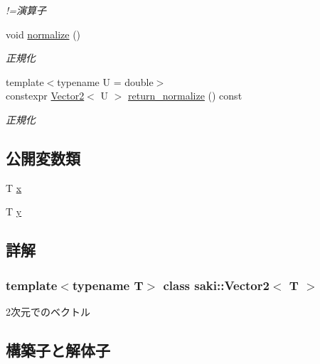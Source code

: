 \begin{DoxyCompactItemize}
\begin{DoxyCompactList}\small\item\em !=演算子 \end{DoxyCompactList}\item 
void \mbox{\hyperlink{classsaki_1_1_vector2_a8267f8608ffad9796813856c05076d8c}{normalize}} ()
\begin{DoxyCompactList}\small\item\em 正規化 \end{DoxyCompactList}\item 
{\footnotesize template$<$typename U  = double$>$ }\\constexpr \mbox{\hyperlink{classsaki_1_1_vector2}{Vector2}}$<$ U $>$ \mbox{\hyperlink{classsaki_1_1_vector2_ad4fe2f7cb118bfad82333017c15c591a}{return\+\_\+normalize}} () const
\begin{DoxyCompactList}\small\item\em 正規化 \end{DoxyCompactList}\end{DoxyCompactItemize}
\subsection*{公開変数類}
\begin{DoxyCompactItemize}
\item 
T \mbox{\hyperlink{classsaki_1_1_vector2_a69df7df6da198f35ef8ed269eb095c27}{x}}
\item 
T \mbox{\hyperlink{classsaki_1_1_vector2_a54e83290254fb653eff9b8dcf6a10878}{y}}
\end{DoxyCompactItemize}


\subsection{詳解}
\subsubsection*{template$<$typename T$>$\newline
class saki\+::\+Vector2$<$ T $>$}

2次元でのベクトル 

\subsection{構築子と解体子}
\mbox{\label{classsaki_1_1_vector2_af57b72f4255812a361bef1922a226f86}} 
